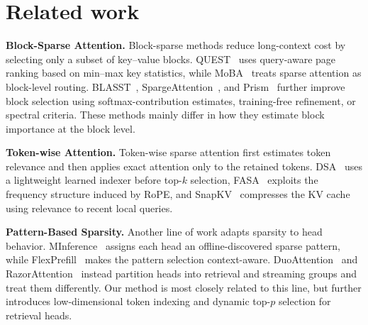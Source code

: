 \section{Related work}

\noindent\textbf{Block-Sparse Attention.} Block-sparse methods reduce long-context cost by selecting only a subset of key--value blocks. QUEST~\citep{Quest} uses query-aware page ranking based on min--max key statistics, while MoBA~\citep{MoBA} treats sparse attention as block-level routing. BLASST~\citep{blasst}, SpargeAttention~\citep{spargeattn}, and Prism~\citep{prism} further improve block selection using softmax-contribution estimates, training-free refinement, or spectral criteria. These methods mainly differ in how they estimate block importance at the block level.

\noindent\textbf{Token-wise Attention.} Token-wise sparse attention first estimates token relevance and then applies exact attention only to the retained tokens. DSA~\citep{dsa} uses a lightweight learned indexer before top-$k$ selection, FASA~\citep{fasa} exploits the frequency structure induced by RoPE, and SnapKV~\citep{snapkv} compresses the KV cache using relevance to recent local queries.

\noindent\textbf{Pattern-Based Sparsity.} Another line of work adapts sparsity to head behavior. MInference~\citep{minference} assigns each head an offline-discovered sparse pattern, while FlexPrefill~\citep{flexprefill} makes the pattern selection context-aware. DuoAttention~\citep{duoattn} and RazorAttention~\citep{razorattn} instead partition heads into retrieval and streaming groups and treat them differently. Our method is most closely related to this line, but further introduces low-dimensional token indexing and dynamic top-$p$ selection for retrieval heads.
